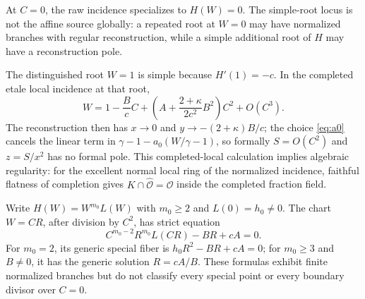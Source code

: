 At $C=0$, the raw incidence specializes to $H(W)=0$.  The simple-root locus
is not the affine source globally: a repeated root at $W=0$ may have normalized
branches with regular reconstruction, while a simple additional root of $H$
may have a reconstruction pole.

The distinguished root $W=1$ is simple because $H'(1)=-c$.  In the completed
etale local incidence at that root,
\begin{equation}\label{eq:root-one-expansion}
 W=1-\frac BcC+
 \left(A+\frac{2+\kappa}{2c^2}B^2\right)C^2+O(C^3).
\end{equation}
The reconstruction then has $x\to0$ and
$y\to-(2+\kappa)B/c$; the choice \eqref{eq:a0} cancels the linear term in
$\gamma-1-a_0(W/\gamma-1)$, so formally $S=O(C^2)$ and $z=S/x^2$ has no
formal pole.
This completed-local calculation implies algebraic regularity: for the
excellent normal local ring of the normalized incidence, faithful flatness of
completion gives $K\cap\widehat{\mathcal O}=\mathcal O$ inside the completed
fraction field.

Write $H(W)=W^{m_0}L(W)$ with $m_0\ge2$ and $L(0)=h_0\ne0$.  The chart
$W=CR$, after division by $C^2$, has strict equation
\begin{equation}\label{eq:zero-cluster}
 C^{m_0-2}R^{m_0}L(CR)-BR+cA=0.
\end{equation}
For $m_0=2$, its generic special fiber is
$h_0R^2-BR+cA=0$; for $m_0\ge3$ and $B\ne0$, it has the generic solution
$R=cA/B$.  These formulas exhibit finite normalized branches but do not
classify every special point or every boundary divisor over $C=0$.
